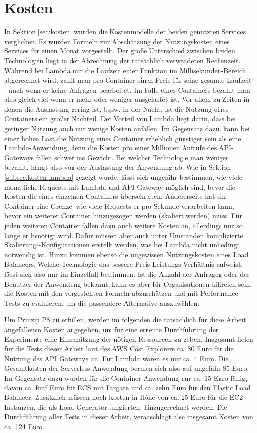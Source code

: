 \section{Kosten}
In Sektion \ref{sec:kosten} wurden die Kostenmodelle der beiden genutzten Services verglichen. Es wurden Formeln zur Abschätzung der Nutzungskosten eines Services für einen Monat vorgestellt. Der große Unterschied zwischen beiden Technologien liegt in der Abrechnung der tatsächlich verwendeten Rechenzeit. Während bei Lambda nur die Laufzeit einer Funktion im Millisekunden-Bereich abgerechnet wird, zahlt man pro Container einen Preis für seine gesamte Laufzeit - auch wenn er keine Anfragen bearbeitet. Im Falle eines Containers bezahlt man also gleich viel wenn er mehr oder weniger ausgelastet ist. Vor allem zu Zeiten in denen die Auslastung gering ist, bspw. in der Nacht, ist die Nutzung eines Containers ein großer Nachteil. Der Vorteil von Lambda liegt darin, dass bei geringer Nutzung auch nur wenige Kosten anfallen. 
Im Gegensatz dazu, kann bei einer hohen Last die Nutzung eines Container erheblich günstiger sein als eine Lambda-Anwendung, denn die Kosten pro einer Millionen Aufrufe des API-Gateways fallen schwer ins Gewicht. Bei welcher Technologie man weniger bezahlt, hängt also von der Auslastung der Anwendung ab. Wie in Sektion \ref{subsec:kosten-lambda} gezeigt wurde, lässt sich ungefähr bestimmen, wie viele monatliche Requests mit Lambda und API Gateway möglich sind, bevor die Kosten die eines einzelnen Containers überschreiten. Andererseits hat ein Container eine Grenze, wie viele Requests er pro Sekunde verarbeiten kann, bevor ein weiterer Container hinzugezogen werden (skaliert werden) muss. Für jeden weiteren Container fallen dann auch weitere Kosten an, allerdings nur so lange er benötigt wird. Dafür müssen aber auch unter Umständen komplizierte Skalierungs-Konfigurationen erstellt werden, was bei Lambda nicht unbedingt notwendig ist. Hinzu kommen ebenso die ungewissen Nutzungskosten eines Load Balancers. Welche Technologie das bessere Preis-Leistungs-Verhältnis aufweist, lässt sich also nur im Einzelfall bestimmen. Ist die Anzahl der Anfragen oder der Benutzer der Anwendung bekannt, kann es aber für Organisationen hilfreich sein, die Kosten mit den vorgestellten Formeln abzuschätzen und mit Performance-Tests zu evaluieren, um die passendere Alternative auszuwählen. 

Um Prinzip P8 zu erfüllen, werden im folgenden die tatsächlich für diese Arbeit angefallenen Kosten angegeben, um für eine erneute Durchführung der Experimente eine Einschätzung der nötigen Ressourcen zu geben.
Insgesamt fielen für die Tests dieser Arbeit laut des AWS Cost Explorers ca. 80 Euro für die Nutzung des API Gateways an. Für Lambda waren es nur ca. 4 Euro. Die Gesamtkosten der Serverless-Anwendung berufen sich also auf ungefähr 85 Euro.
Im Gegensatz dazu wurden für die Container Anwendung nur ca. 15 Euro fällig, davon ca. fünf Euro für ECS mit Fargate und ca. zehn Euro für den Elastic Load Balancer.
Zusätzlich müssen noch Kosten in Höhe von ca. 25 Euro für die EC2-Instanzen, die als Load-Generator fungierten, hinzugerechnet werden.
Die Durchführung aller Tests in dieser Arbeit, veranschlagt also insgesamt Kosten von ca. 124 Euro.

